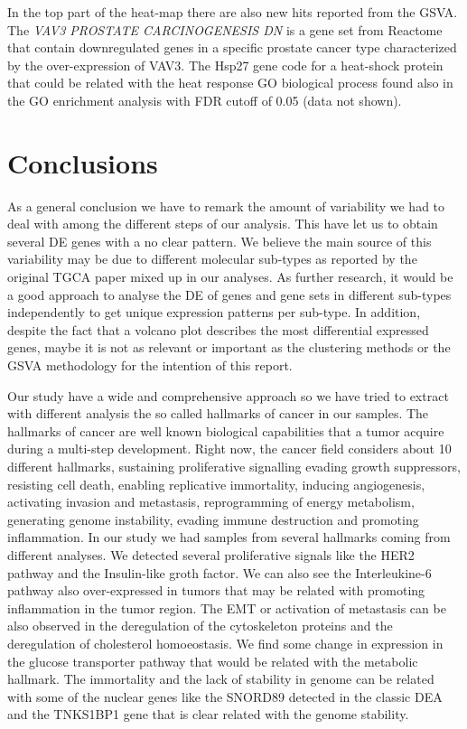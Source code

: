 \documentclass[9pt,twocolumn,twoside]{gsajnl}
\begin{document}
In the top part of the heat-map there are also new hits reported from the GSVA. The  \textit{VAV3 PROSTATE CARCINOGENESIS DN} \citep{liu2008targeted} is a gene set from Reactome that contain downregulated genes in a specific prostate cancer type characterized by the over-expression of VAV3. The Hsp27 gene code for a heat-shock protein that could be related with the heat response GO biological process found also in the GO enrichment analysis with FDR cutoff of 0.05 (data not shown).


\section*{Conclusions}

As a general conclusion we have to remark the amount of variability we had to deal with among the different steps of our analysis. This have let us to obtain several DE genes with a no clear pattern. We believe the main source of this variability may be due to different molecular sub-types as reported by the original TGCA paper \citep{Abeshouse2015} mixed up in our analyses.  As further research, it would be a good approach to analyse the DE of genes and gene sets in different sub-types independently to get unique expression patterns per sub-type. In addition, despite the fact that a volcano plot describes the most differential expressed genes, maybe it is not as relevant or important as the clustering methods or the GSVA methodology for the intention of this report.
 

Our study have a wide and comprehensive approach so we have tried to extract with different analysis the so called hallmarks of cancer in our samples. The hallmarks of cancer are well known biological capabilities that a tumor acquire during a multi-step development. Right now, the cancer field considers about 10 different hallmarks, sustaining proliferative signalling
evading growth suppressors, resisting cell death, enabling replicative immortality, inducing angiogenesis, activating invasion and metastasis, reprogramming of energy metabolism, generating genome instability,  evading immune destruction and promoting inflammation\citep{hanahan2011hallmarks}. In our study we had samples from several hallmarks coming from different analyses. We detected several proliferative signals like the HER2 pathway and the Insulin-like groth factor. We can also see the Interleukine-6 pathway also over-expressed in tumors that may be related with promoting inflammation in the tumor region. The EMT or activation of metastasis can be also observed in the deregulation of the cytoskeleton proteins and the deregulation of cholesterol homoeostasis. We find some change in expression in the glucose transporter pathway that would be related with the metabolic hallmark. The immortality and the lack of stability in genome can be related with some of the nuclear genes like the SNORD89 detected in the classic DEA and the TNKS1BP1 gene that is clear related with the genome stability. 
\end{document}
